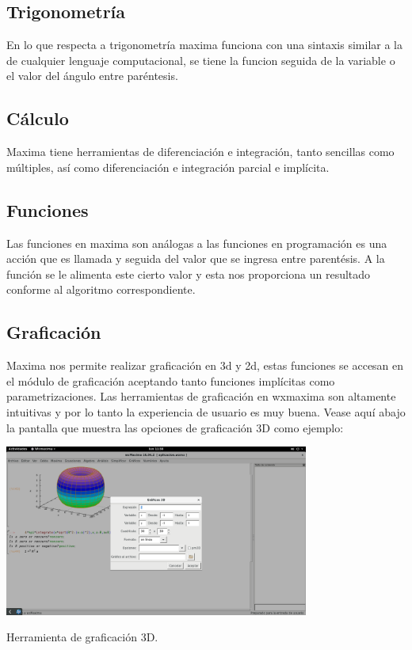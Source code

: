 \documentclass{article} %
\begin{document}
\subsection{Trigonometría}

En lo que respecta a trigonometría maxima funciona con una sintaxis similar a la de cualquier lenguaje computacional, se tiene la funcion seguida de la variable o el valor del ángulo entre paréntesis. 

\subsection{Cálculo}

Maxima tiene herramientas de diferenciación e integración, tanto sencillas como múltiples, así como diferenciación e integración parcial e implícita. 

\subsection{Funciones}

Las funciones en maxima son análogas a las funciones en programación es una acción que es llamada y seguida del valor que se ingresa entre parentésis. A la función se le alimenta este cierto valor y esta nos proporciona un resultado conforme al algoritmo correspondiente. 

\subsection{Graficación}

Maxima nos permite realizar graficación en 3d y 2d, estas funciones se accesan en el módulo de graficación aceptando tanto funciones implícitas como parametrizaciones. Las herramientas de graficación en wxmaxima son altamente intuitivas y por lo tanto la experiencia de usuario es muy buena. Vease aquí abajo la pantalla que muestra las opciones de graficación 3D como ejemplo:

\begin{center}

	\includegraphics[width=10cm]{pantalla.png}
    
    Herramienta de graficación 3D.
    
\end{center}
\end{document}
